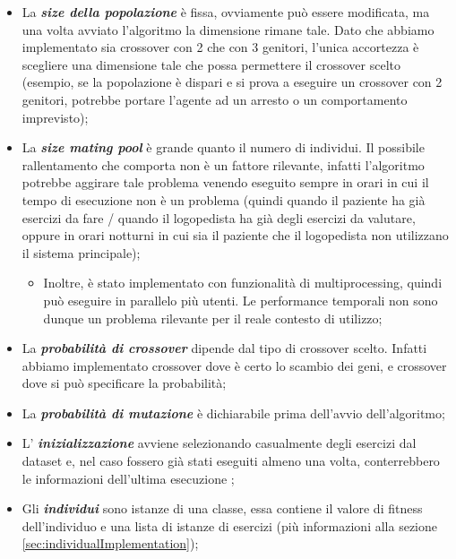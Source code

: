 \documentclass{article}
\begin{document}
\begin{itemize}
\item La \textbf{\textit{size della popolazione}} è fissa, ovviamente può essere modificata, ma una volta avviato l'algoritmo la dimensione rimane tale. Dato che abbiamo implementato sia crossover con 2 che con 3 genitori, l'unica accortezza è scegliere una dimensione tale che possa permettere il crossover scelto (esempio, se la popolazione è dispari e si prova a eseguire un crossover con 2 genitori, potrebbe portare l'agente ad un arresto o un comportamento imprevisto);

\item La \textbf{\textit{size mating pool}} è grande quanto il numero di individui. Il possibile rallentamento che comporta non è un fattore rilevante, infatti l'algoritmo potrebbe aggirare tale problema venendo eseguito sempre in orari in cui il tempo di esecuzione non è un problema (quindi quando il paziente ha già esercizi da fare / quando il logopedista ha già degli esercizi da valutare, oppure in orari notturni in cui sia il paziente che il logopedista non utilizzano il sistema principale);
\begin{itemize}
    \item Inoltre, è stato implementato con funzionalità di multiprocessing, quindi può eseguire in parallelo più utenti. Le performance temporali non sono dunque un problema rilevante per il reale contesto di utilizzo;
\end{itemize}
\item La \textbf{\textit{probabilità di crossover}} dipende dal tipo di crossover scelto. Infatti abbiamo implementato crossover dove è certo lo scambio dei geni, e crossover dove si può specificare la probabilità;

\item La \textbf{\textit{probabilità di mutazione}} è dichiarabile prima dell'avvio dell'algoritmo;

\item L' \textbf{\textit{inizializzazione}} avviene selezionando casualmente degli esercizi dal dataset e, nel caso fossero già stati eseguiti almeno una volta, conterrebbero le informazioni dell'ultima esecuzione ;

\item Gli \textbf{\textit{individui}} sono istanze di una classe, essa contiene il valore di fitness dell'individuo e una lista di istanze di esercizi (più informazioni alla sezione \ref{sec:individualImplementation});

\begin{itemize}


\end{itemize}
\end{itemize}
\end{document}
